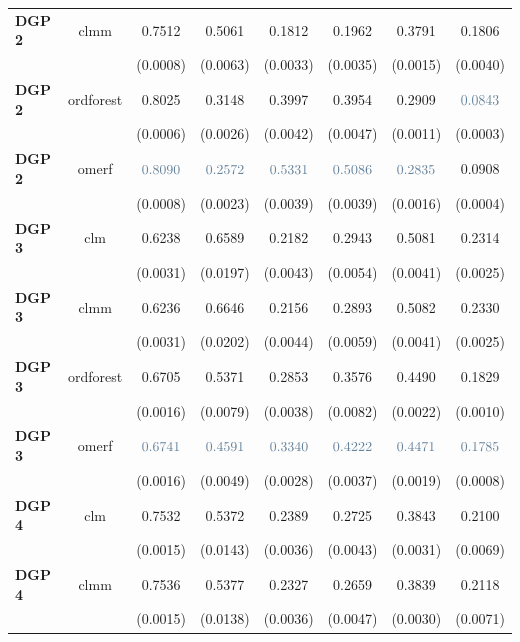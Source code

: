 \begin{table}[H]
\begin{tabular}{|p{4em} c c c c c c c |}
    \textbf{DGP 2} & clmm & 0.7512 & 0.5061 & 0.1812 & 0.1962 & 0.3791 & 0.1806 \T\B \\
    \textbf{} &  & (0.0008) & (0.0063) & (0.0033) & (0.0035) & (0.0015) & (0.0040) \T\B \\
    \textbf{DGP 2} & ordforest & 0.8025 & 0.3148 & 0.3997 & 0.3954 & 0.2909 & $\textcolor{bluePoli}{0.0843}$ \T\B \\
    \textbf{} &  & (0.0006) & (0.0026) & (0.0042) & (0.0047) & (0.0011) & (0.0003) \T\B \\
    \textbf{DGP 2} & omerf & $\textcolor{bluePoli}{0.8090}$ & $\textcolor{bluePoli}{0.2572}$ & $\textcolor{bluePoli}{0.5331}$ & $\textcolor{bluePoli}{0.5086}$ & $\textcolor{bluePoli}{0.2835}$ & 0.0908 \T\B \\
    \textbf{} &  & (0.0008) & (0.0023) & (0.0039) & (0.0039) & (0.0016) & (0.0004) \T\B \\
    \hline
    \textbf{DGP 3} & clm & 0.6238 & 0.6589 & 0.2182 & 0.2943 &  0.5081 & 0.2314 \T\B \\
    \textbf{} &  & (0.0031) & (0.0197) & (0.0043) & (0.0054) & (0.0041) & (0.0025) \T\B \\
    \textbf{DGP 3} & clmm & 0.6236 & 0.6646 & 0.2156 & 0.2893 &  0.5082 & 0.2330 \T\B \\
    \textbf{} &  & (0.0031) & (0.0202) & (0.0044) & (0.0059) & (0.0041) & (0.0025) \T\B \\
    \textbf{DGP 3} & ordforest & 0.6705 & 0.5371 & 0.2853 & 0.3576 & 0.4490 & 0.1829 \T\B \\
    \textbf{} &  & (0.0016) & (0.0079) & (0.0038) & (0.0082) & (0.0022) & (0.0010) \T\B \\
    \textbf{DGP 3} & omerf & $\textcolor{bluePoli}{0.6741}$ & $\textcolor{bluePoli}{0.4591}$ & $\textcolor{bluePoli}{0.3340}$ & $\textcolor{bluePoli}{0.4222}$ & $\textcolor{bluePoli}{0.4471}$ & $\textcolor{bluePoli}{0.1785}$ \T\B \\
    \textbf{} &  & (0.0016) & (0.0049) & (0.0028) & (0.0037) & (0.0019) & (0.0008) \T\B \\
    \hline
    \textbf{DGP 4} & clm & 0.7532 & 0.5372 & 0.2389 & 0.2725 & 0.3843 & 0.2100 \T\B \\
    \textbf{} &  & (0.0015) & (0.0143) & (0.0036) & (0.0043) & (0.0031) & (0.0069) \T\B \\
    \textbf{DGP 4} & clmm & 0.7536 & 0.5377 & 0.2327 & 0.2659 & 0.3839 & 0.2118 \T\B \\
    \textbf{} &  & (0.0015) & (0.0138) & (0.0036) & (0.0047) & (0.0030) & (0.0071) \T\B \\

\end{tabular}
\end{table}
